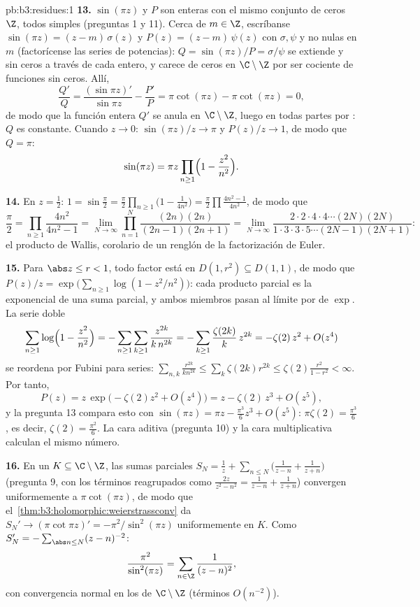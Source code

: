 \begin{solution}{pb:b3:residues:1}
\textbf{13.} $\sin(\pi z)$ y $P$ son enteras con el mismo conjunto de
ceros $\Z$, todos simples (preguntas 1 y 11). Cerca de $m \in \Z$,
escríbanse $\sin(\pi z) = (z - m)\,\sigma(z)$ y
$P(z) = (z - m)\,\psi(z)$ con $\sigma, \psi$
 y no nulas en $m$
(factorícense las series de potencias): $Q =
\sin(\pi z)/P = \sigma/\psi$ se extiende
 y sin ceros a través de
cada entero, y carece de ceros en $\C\setminus\Z$ por ser cociente de
funciones sin ceros. Allí,
\[
\frac{Q'}{Q} = \frac{(\sin\pi z)'}{\sin\pi z} -
\frac{P'}{P} = \pi\cot(\pi z) - \pi\cot(\pi z) = 0 ,
\]
de modo que la función entera $Q'$ se anula en $\C\setminus\Z$, luego en
todas partes por : $Q$
es constante. Cuando $z \to
0$: $\sin(\pi z)/z \to \pi$ y $P(z)/z \to 1$, de modo que $Q =
\pi$:
\[
\sin(\pi z) = \pi z\prod_{n\geq1}
\Bigl(1 - \frac{z^2}{n^2}\Bigr) .
\]

\textbf{14.} En $z = \frac12$: $1 = \sin\frac\pi2 =
\frac\pi2\prod_{n\geq1}\bigl(1 - \frac1{4n^2}\bigr) =
\frac\pi2\prod\frac{4n^2-1}{4n^2}$, de modo que
\[
\frac\pi2 = \prod_{n\geq1}\frac{4n^2}{4n^2 - 1}
= \lim_{N\to\infty}\prod_{n=1}^N
\frac{(2n)(2n)}{(2n-1)(2n+1)}
= \lim_{N\to\infty}
\frac{2\cdot2\cdot4\cdot4\cdots(2N)(2N)}
{1\cdot3\cdot3\cdot5\cdots(2N-1)(2N+1)} :
\]
el producto de Wallis, corolario de un renglón de la factorización de
Euler.

\textbf{15.} Para $\abs z \leq r < 1$, todo factor está en
$D(1, r^2) \subseteq D(1, 1)$, de modo que $P(z)/z = \exp\bigl(
\sum_{n\geq1}\log(1 - z^2/n^2)\bigr)$: cada producto parcial es la
exponencial de una suma parcial, y ambos miembros pasan al límite por
 de $\exp$. La serie
doble
\[
\sum_{n\geq1}\log\Bigl(1 - \frac{z^2}{n^2}\Bigr)
= -\sum_{n\geq1}\sum_{k\geq1}\frac{z^{2k}}{k\,n^{2k}}
= -\sum_{k\geq1}\frac{\zeta(2k)}k\,z^{2k}
= -\zeta(2)\,z^2 + O(z^4)
\]
se reordena por Fubini para series: $\sum_{n,k}
\frac{r^{2k}}{kn^{2k}} \leq \sum_k\zeta(2k)r^{2k} \leq
\zeta(2)\frac{r^2}{1-r^2} < \infty$. Por tanto,
\[
P(z) = z\,\exp\bigl(-\zeta(2)z^2 + O(z^4)\bigr)
= z - \zeta(2)\,z^3 + O(z^5) ,
\]
y la pregunta 13 compara esto con $\sin(\pi z) = \pi z -
\frac{\pi^3}6z^3 + O(z^5)$: $\pi\zeta(2) = \frac{\pi^3}6$, es decir,
$\zeta(2) = \frac{\pi^2}6$. La cara aditiva (pregunta 10) y la cara
multiplicativa calculan el mismo número.

\textbf{16.} En un 
$K \subseteq \C\setminus\Z$, las sumas parciales
$S_N = \frac1z + \sum_{n\leq N}\bigl(
\frac1{z-n} + \frac1{z+n}\bigr)$ (pregunta 9, con los términos
reagrupados como $\frac{2z}{z^2-n^2} = \frac1{z-n} +
\frac1{z+n}$) convergen uniformemente a $\pi\cot(\pi z)$, de modo que
el~\cref{thm:b3:holomorphic:weierstrassconv} da $S_N' \to
(\pi\cot\pi z)' = -\pi^2/\sin^2(\pi z)$ uniformemente en $K$. Como
$S_N' = -\sum_{\abs n\leq N}(z - n)^{-2}$:
\[
\frac{\pi^2}{\sin^2(\pi z)} =
\sum_{n\in\Z}\frac1{(z - n)^2} ,
\]
con convergencia normal en los
 de $\C\setminus\Z$ (términos
$O(n^{-2})$).


\end{solution}

